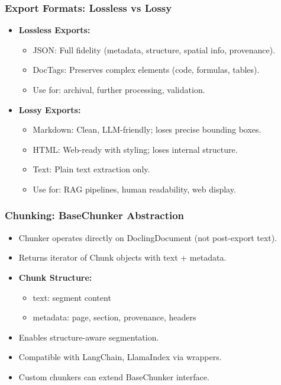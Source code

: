 \begin{frame}[fragile]\frametitle{Export Formats: Lossless vs Lossy}
      \begin{itemize}
        \item \textbf{Lossless Exports:}
        \begin{itemize}
          \item JSON: Full fidelity (metadata, structure, spatial info, provenance).
          \item DocTags: Preserves complex elements (code, formulas, tables).
          \item Use for: archival, further processing, validation.
        \end{itemize}
        \item \textbf{Lossy Exports:}
        \begin{itemize}
          \item Markdown: Clean, LLM-friendly; loses precise bounding boxes.
          \item HTML: Web-ready with styling; loses internal structure.
          \item Text: Plain text extraction only.
          \item Use for: RAG pipelines, human readability, web display.
        \end{itemize}
      \end{itemize}
\end{frame}

\begin{frame}[fragile]\frametitle{Chunking: BaseChunker Abstraction}
      \begin{itemize}
        \item Chunker operates directly on DoclingDocument (not post-export text).
        \item Returns iterator of Chunk objects with text + metadata.
        \item \textbf{Chunk Structure:}
        \begin{itemize}
          \item text: segment content
          \item metadata: page, section, provenance, headers
        \end{itemize}
        \item Enables structure-aware segmentation.
        \item Compatible with LangChain, LlamaIndex via wrappers.
        \item Custom chunkers can extend BaseChunker interface.
      \end{itemize}
\end{frame}

